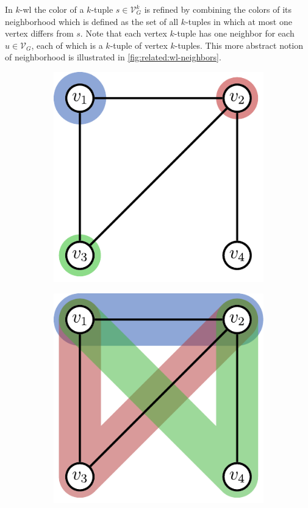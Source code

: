 In $k$-\acs{wl} the color of a $k$-tuple $s \in \mathcal{V}_G^k$ is refined by combining the colors of its neighborhood which is defined as the set of all $k$-tuples in which at most one vertex differs from $s$.
Note that each vertex $k$-tuple has one neighbor for each $u \in \mathcal{V}_G$, each of which is a $k$-tuple of vertex $k$-tuples.
This more abstract notion of neighborhood is illustrated in \cref{fig:related:wl-neighbors}.
\begin{figure}[ht]
	\centering
	\begin{subfigure}{0.33\textwidth}
		\centering
		\includegraphics[width=0.8\linewidth]{gfx/related-work/wl1-neighbors.pdf}
		\label{fig:related:wl-neighbors:1}
	\end{subfigure}%
	\begin{subfigure}{0.33\textwidth}
		\centering
		\includegraphics[width=0.8\linewidth]{gfx/related-work/wl2-neighbors.pdf}

\end{subfigure}
\end{figure}
